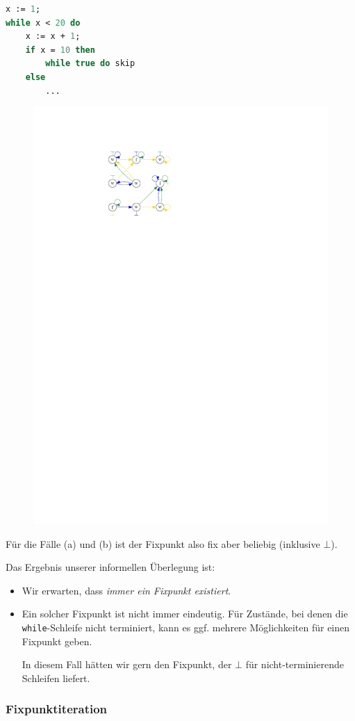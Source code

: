 \begin{enumerate}
\begin{enumerate}
\begin{lstlisting}[language=Pascal]
x := 1;
while x < 20 do
    x := x + 1;
    if x = 10 then
        while true do skip
    else
        ...
\end{lstlisting}
        \begin{figure}[H]
            \centering
            \includegraphics[page=6,width=.6\textwidth]{img/f-combined}
        \end{figure}
        \end{enumerate}
        Für die Fälle (a) und (b) ist der Fixpunkt also fix aber beliebig (inklusive $\bot$).
\end{enumerate}

\par\bigskip
Das Ergebnis unserer informellen Überlegung ist:
\begin{itemize}
    \item Wir erwarten, dass \emph{immer ein Fixpunkt existiert}.
    \item Ein solcher Fixpunkt ist nicht immer eindeutig. Für Zustände, bei denen die \texttt{while}-Schleife nicht terminiert, kann es ggf. mehrere Möglichkeiten für einen Fixpunkt geben.

        In diesem Fall hätten wir gern den Fixpunkt, der $\bot$ für nicht-terminierende Schleifen liefert.
\end{itemize}


\subsubsection{Fixpunktiteration}

